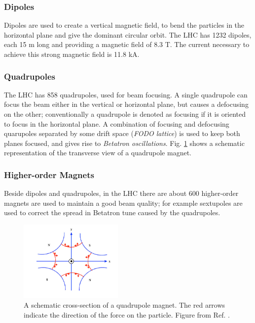 \subsubsection*{Dipoles} 
Dipoles are used to create a vertical magnetic field, to bend the particles in the horizontal plane and give the dominant circular orbit. The LHC has 1232 dipoles, each 15 m long and providing a magnetic field of 8.3 T. The current necessary to achieve this strong magnetic field is 11.8 kA.


\subsubsection*{Quadrupoles}
The LHC has 858 quadrupoles, used for beam focusing. A single quadrupole can focus the beam either in the vertical or horizontal plane, but causes a defocusing on the other; conventionally a quadrupole is denoted as focusing if it is oriented to focus in the horizontal plane. A combination of focusing and defocusing quarupoles separated by some drift space (\textit{FODO lattice}) is used to keep both planes focused, and gives rise to \textit{Betatron oscillations}. Fig. \ref{fig:lhc:quad} shows a schematic representation of the transverse view of a quadrupole magnet.

\subsubsection*{Higher-order Magnets} 
Beside dipoles and quadrupoles, in the LHC there are about 600 higher-order magnets are used to maintain a good beam quality; for example sextupoles are used to correct the spread in Betatron tune caused by the quadrupoles.




\begin{figure}[ht]
\centering
\includegraphics[width=0.45\textwidth]{figures/lhc/figures_quad}
\caption{A schematic cross-section of a quadrupole magnet. The red arrows indicate the direction of the force on the particle. Figure from Ref. \cite{Kain:2016aly}.}
\label{fig:lhc:quad}
\end{figure}

